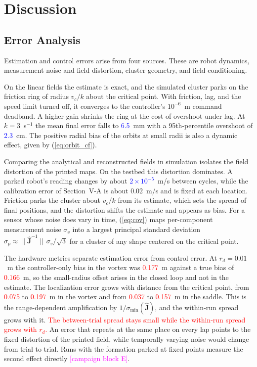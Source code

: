 \documentclass[lettersize,journal]{IEEEtran}
\newcommand{\syn}[1]{\textcolor{red}{#1}}            %
\newcommand{\rev}[1]{\textcolor{blue}{#1}}           %
\newcommand{\open}[1]{\textcolor{magenta}{[#1]}}     %
\begin{document}
\section{Discussion}

\subsection{Error Analysis}

Estimation and control errors arise from four sources. These are robot dynamics, measurement noise and field distortion, cluster geometry, and field conditioning.

On the linear fields the estimate is exact, and the simulated cluster parks on the friction ring of radius $v_c/k$ about the critical point. With friction, lag, and the speed limit turned off, it converges to the controller's $10^{-6}$~m command deadband. A higher gain shrinks the ring at the cost of overshoot under lag. At $k = 3$~s$^{-1}$ the mean final error falls to \rev{6.5}~mm with a 95th-percentile overshoot of \rev{2.3}~cm. The positive radial bias of the orbits at small radii is also a dynamic effect, given by (\ref{eq:orbit_cf}). %

Comparing the analytical and reconstructed fields in simulation isolates the field distortion of the printed maps. On the testbed this distortion dominates. A parked robot's reading changes by about \rev{$2\times10^{-5}$}~m/s between cycles, while the calibration error of Section~V-A is about 0.02~m/s and is fixed at each location. Friction parks the cluster about $v_c/k$ from its estimate, which sets the spread of final positions, and the distortion shifts the estimate and appears as bias. For a sensor whose noise does vary in time, (\ref{eq:cov}) maps per-component measurement noise $\sigma_v$ into a largest principal standard deviation $\sigma_p \approx \|\hat{\mathbf{J}}^{-1}\|\,\sigma_v/\sqrt{3}$ for a cluster of any shape centered on the critical point. %

The hardware metrics separate estimation error from control error. At $r_d = 0.01$~m the controller-only bias in the vortex was \syn{0.177}~m against a true bias of \syn{0.166}~m, so the small-radius offset arises in the closed loop and not in the estimate. The localization error grows with distance from the critical point, from \syn{0.075} to \syn{0.197}~m in the vortex and from \syn{0.037} to \syn{0.157}~m in the saddle. This is the range-dependent amplification by $1/\sigma_{\min}(\hat{\mathbf{J}})$, and the within-run spread grows with it. \syn{The between-trial spread stays small while the within-run spread grows with $r_d$.} An error that repeats at the same place on every lap points to the fixed distortion of the printed field, while temporally varying noise would change from trial to trial. Runs with the formation parked at fixed points measure the second effect directly \open{campaign block E}. %
\end{document}

